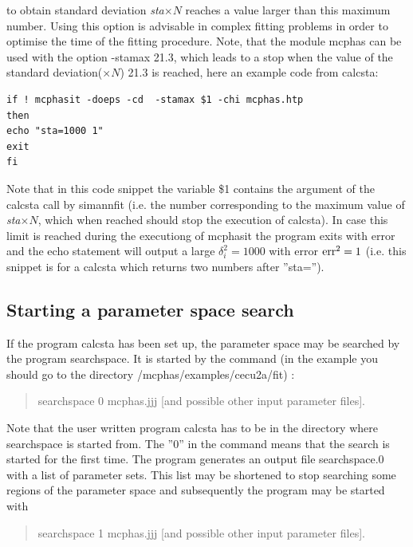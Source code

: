 \begin{enumerate}
to obtain standard deviation {\em sta}$\times N$ reaches a value larger than this maximum
number. Using this option is advisable in complex fitting problems in order to
optimise the time of the fitting procedure. Note, that the module {\prg mcphas}
can be used with the option {\prg -stamax 21.3}, which leads to a stop when the value of 
the standard deviation($\times N$) 21.3 is reached, here an example code from {\prg calcsta}:
\begin{verbatim}
if ! mcphasit -doeps -cd  -stamax $1 -chi mcphas.htp
then
echo "sta=1000 1"
exit
fi
\end{verbatim}
Note that in this code snippet the variable \$1 contains the argument of the calcsta call by
{\prg simannfit} (i.e. the number corresponding to the maximum value of {\em sta}$\times N$, which when reached
should stop the execution of calcsta). In case this limit is reached during the executiong of {\prg mcphasit}
the program exits with error and the {\prg echo} statement will output a large $\delta_i^2=1000$ with
error ${\rm err}^2=1$ (i.e. this snippet is for a calcsta which returns two numbers after ''sta='').
\end{enumerate}

\subsection{Starting a parameter space search}

If the program {\prg calcsta} has been set up, the parameter space may be
searched by the program {\prg searchspace}. It is started
by the command (in the example you should go to the directory {\prg /mcphas/examples/cecu2a/fit}) 
:

\begin{quote}
 {\prg searchspace 0 mcphas.jjj [and possible other input parameter files]}.
\end{quote}


Note that the user written program {\prg calcsta} has to be in the
directory where {\prg searchspace} is started from.
The ''0'' in the command means that the search is started for the first time.
The program generates an output file {\prg searchspace.0} with a list
of parameter sets. This list may be shortened to stop searching 
some regions of the parameter space and subsequently the program may be started
with

\begin{quote}
 {\prg searchspace 1 mcphas.jjj [and possible other input parameter files]}.
\end{quote}


